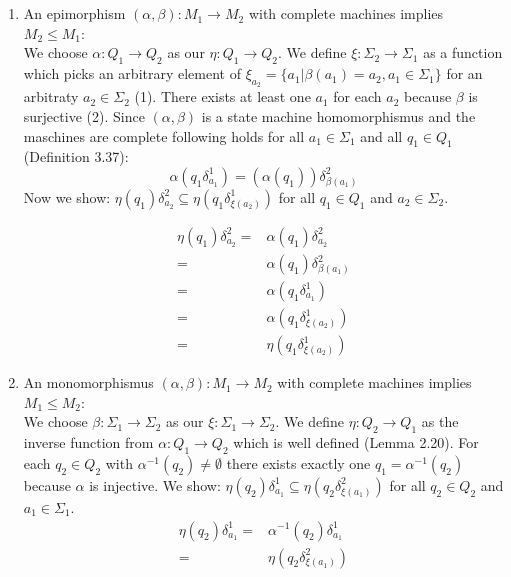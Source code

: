 \documentclass[a4paper,12pt,numbers=noenddot]{scrreport}
\begin{document}

\chapter{}
\section{}
\begin{enumerate}
    \item An epimorphism $(\alpha, \beta): M_1 \rightarrow M_2$ with complete machines implies $M_2 \leq M_1$: \\
We choose $\alpha : Q_1 \rightarrow Q_2$ as our $\eta: Q_1 \rightarrow Q_2$.
We define $\xi: \Sigma_2 \rightarrow \Sigma_1$ as a function which picks an arbitrary element of $\xi_{a_2} = \{a_1 | \beta(a_1) = a_2, a_1 \in \Sigma_1\}$ for an arbitraty $a_2 \in \Sigma_2$ (1).
There exists at least one $a_1$ for each $a_2$ because $\beta$ is surjective (2).
Since $(\alpha,\beta)$ is a state machine homomorphismus and the maschines are complete following holds for all $a_1 \in \Sigma_1$ and all $q_1 \in Q_1$ (Definition 3.37):
$$
\alpha(q_1\delta^1_{a_1}) = (\alpha(q_1))\delta^2_{\beta(a_1)}
$$ 
Now we show: $\eta(q_1)\delta^2_{a_2} \subseteq \eta(q_1\delta^1_{\xi(a_2)})$ for all $q_1 \in Q_1$ and $a_2 \in \Sigma_2$.

\begin{align*}
    \eta(q_1)\delta^2_{a_2} = & \alpha(q_1)\delta^2_{a_2} \\
                 = & \alpha(q_1)\delta^2_{\beta(a_1)} \label{eq1}\tag{2} \\
                 = & \alpha(q_1\delta^1_{a_1}) \\
                 = & \alpha(q_1\delta^1_{\xi(a_2)})\label{eq2}\tag{1} \\
                 = & \eta(q_1\delta^1_{\xi(a_2)})
\end{align*}
    \item An monomorphismus $(\alpha, \beta): M_1 \rightarrow M_2$ with complete machines implies $M_1 \leq M_2$: \\
        We choose $\beta: \Sigma_1 \rightarrow \Sigma_2$ as our $\xi: \Sigma_1 \rightarrow \Sigma_2$.
        We define $\eta: Q_2 \rightarrow Q_1$ as the inverse function from $\alpha: Q_1 \rightarrow Q_2$ which is well defined (Lemma 2.20).
        For each $q_2 \in Q_2$ with $\alpha^{-1}(q_2) \neq \emptyset$ there exists exactly one $q_1 = \alpha^{-1}(q_2)$ because $\alpha$ is injective.
        We show: $\eta(q_2)\delta^1_{a_1} \subseteq \eta(q_2\delta^2_{\xi(a_1)})$ for all $q_2 \in Q_2$ and $a_1 \in \Sigma_1$.
    \begin{align*}
        \eta(q_2)\delta^1_{a_1} = & \alpha^{-1}(q_2)\delta^1_{a_1} \\
                     = & \eta(q_2\delta^2_{\xi(a_1)})
    \end{align*}
\end{enumerate}
\end{document}
